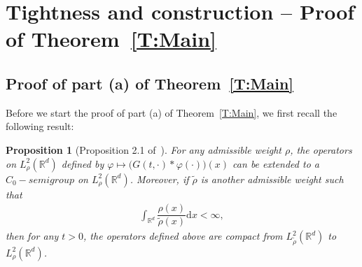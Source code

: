 \documentclass[a4paper,11pt]{article}%
\theoremstyle{plain}
\newtheorem{proposition}[theorem]{Proposition}
\theoremstyle{definition}
\numberwithin{equation}{section}
\newcommand{\R}{\mathbb{R}}
\newcommand{\ud}{\ensuremath{\mathrm{d}}}
\begin{document}
\section{Tightness and construction -- Proof of Theorem~\ref{T:Main}}\label{S:mainproof}
\subsection{Proof of part (a) of Theorem~\ref{T:Main}}

Before we start the proof of part (a) of Theorem~\ref{T:Main}, we first recall the following result:

\begin{proposition}[Proposition 2.1 of~\cite{tessitore.zabczyk:98:invariant}]\label{P:weight}
  For any admissible weight $\rho$, the operators on $L^2_\rho(\R^d)$ defined by $\varphi \mapsto
  \big(G(t,\cdot)*\varphi(\cdot)\big)(x)$ can be extended to a $C_0-semigroup$ on $L^2_\rho(\R^d)$.
  Moreover, if $\tilde{\rho}$ is another admissible weight such that
	\begin{align*}
	\int_{\R^d}\dfrac{\rho(x)}{\tilde{\rho}(x)}\ud x < \infty,
	\end{align*}
	then for any $t>0$, the operators defined above are compact from $L^2_{\tilde{\rho}}(\R^d)$ to
	$L^2_\rho(\R^d)$.
\end{proposition}
\end{document}
